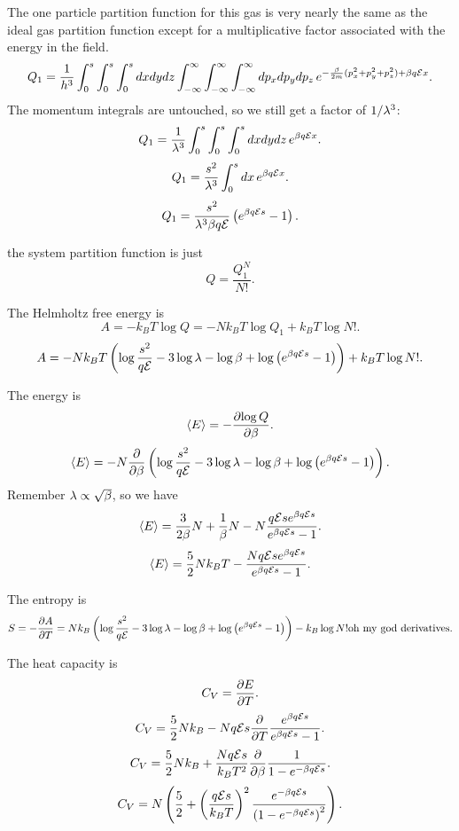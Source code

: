 \documentclass[12pt]{article}
\begin{document}
\hrulefill

 The one particle partition function for this gas is very nearly the same as the ideal gas partition function except for a multiplicative factor associated with the energy in the field.
\newcommand{\elec}{\mathcal{E}}
\[ Q_1 = \recip{h^3} \int_0^s\int_0^s\int_0^s dxdydz \iiint\iiint\iiint dp_x dp_y dp_z \, e^{-\frac{\b}{2m} (p_x^2+p_y^2+p_z^2) + \b q \elec x}.\]
The momentum integrals are untouched, so we still get a factor of $1/\lambda^3$:
\[ Q_1 = \recip{\lam^3} \int_0^s\int_0^s\int_0^sdxdydz\, e^{\b q\elec x}.\]
\[ Q_1 = \frac{s^2}{\lam^3}\int_0^s dx \, e^{\b q \elec x}.\]
\[ Q_1 = \frac{s^2}{\lam^3 \b q \elec}\paren{e^{\b q \elec s} - 1}.\]

 the system partition function is just
\[ Q = \frac{Q_1^N}{N!}.\]

 The Helmholtz free energy is
\[ A = -k_BT \log Q =  -Nk_BT\log Q_1 +  k_BT \log N!.\]
\[ A = -Nk_BT\paren{\log \frac{s^2}{q\elec} - 3\log \lam - \log \b + \log \paren{e^{\b q\elec s} -1} } + k_BT\log N!.\]

 The energy is
\[ \left \langle E \right \rangle = -\frac{\partial {\log Q}}{\partial {\beta}}.\]
\[ \avg{E} = - N\pder{}{\b}\paren{ \log \frac{s^2}{q\elec} - 3\log \lam - \log \b + \log \paren{e^{\b q\elec s} -1} }.\]
Remember $\lambda \propto \sqrt{\beta}$, so we have
\[ \avg{E} = \frac{3}{2\b}N + \recip{\b}N - N\frac{q\elec s e^{\b q \elec s}}{e^{\b q \elec s}-1}.\]
\[ \avg{E} = \half{5}Nk_BT - \frac{Nq\elec s e^{\b q \elec s}}{e^{\b q \elec s}-1}.\]

 The entropy is
\[ S = -\pder{A}{T} = Nk_B\paren{\log \frac{s^2}{q\elec} - 3\log \lam - \log \b + \log \paren{e^{\b q\elec s} -1} } - k_B\log N! \mathrm{oh~my~god~derivatives}.\]

 The heat capacity is
\[ C_V = \frac{\partial {E}}{\partial {T}}.\]
\[ C_V = \frac{5}{2}Nk_B - Nq\elec s \pder{}{T} \frac{e^{\b q\elec s}}{e^{\b q \elec s} - 1}.\]
\[ C_V = \frac{5}{2}Nk_B + \frac{N q\elec s}{k_BT^2} \pder{}{\b} \recip{1-e^{-\b q \elec s}}.\]
\[ C_V = N\paren{ \half{5} + \paren{\frac{q\elec s}{k_BT}}^2\frac{e^{-\b q\elec s}}{\paren{1 - e^{-\b q \elec s}}^2} }.\]
\end{document}
